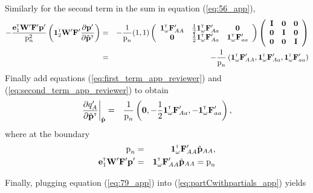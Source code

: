 \documentclass[11pt]{article}
\newcommand{\bo}[1]{{\bf #1}}
\newcommand{\tr}{{\mbox{\tiny \sf T}}}
\begin{document}
Similarly for the second term in the sum in equation (\ref{eq:56_app}),
\begin{eqnarray}
	- \frac{\mathbf{e}_1^\tr \mathbf{W}^\prime \mathbf{F}^\prime \mathbf{p}^\prime}{ \mbox{p}_{n}^2} \left( \mathbf{1}^\tr_{2}\mathbf{W}^\prime\mathbf{F}^\prime \frac{\partial  \mathbf{p}^\prime}{\partial \tilde{\bo p}^\tr} \right) &=& -\frac{1}{ \mbox{p}_{n}}(1,1) \left(\begin{array} {ccc}
\mathbf{1}^\tr_{\omega} \mathbf{F}_{AA}^\prime& \frac{1}{2}\mathbf{1}^\tr_{\omega} \mathbf{F}_{Aa}^\prime &\mathbf{0} \\
\mathbf{0} &\frac{1}{2}\mathbf{1}^\tr_{\omega} \mathbf{F}_{Aa}^\prime & \mathbf{1}^\tr_{\omega} \mathbf{F}_{aa}^\prime
\end{array}\right)  \left(\begin{array} {ccc}
\mathbf{I}&\mathbf{0}  &\mathbf{0} \\
\mathbf{0} &\mathbf{I}& \mathbf{0}  \\
\mathbf{0} &\mathbf{0}  &  \mathbf{I}
\end{array}\right) \nonumber \\
 &=& -\frac{1}{ \mbox{p}_{n}} \left( \mathbf{1}^\tr_{\omega} \mathbf{F}_{AA}^\prime, \mathbf{1}^\tr_{\omega} \mathbf{F}_{Aa}^\prime, \mathbf{1}^\tr_{\omega} \mathbf{F}_{aa}^\prime   \right) \label{eq:second_term_app_reviewer}
\end{eqnarray}
Finally add equations (\ref{eq:first_term_app_reviewer}) and (\ref{eq:second_term_app_reviewer}) to obtain
\begin{eqnarray}
  \frac{\partial   q^\prime_A }{\partial \tilde{\bo p}^\tr}\bigg\rvert_{\hat{\bo p}}&=& \frac{1}{ \mbox{p}_{n}} \left( \mathbf{0},  -\frac{1}{2}\mathbf{1}^\tr_{\omega} \mathbf{F}_{Aa}^\prime, -\mathbf{1}^\tr_{\omega} \mathbf{F}_{aa}^\prime \right) \label{eq:79_app},
\end{eqnarray}
where at the boundary
\begin{eqnarray}
  \mbox{p}_{n}&=&\mathbf{1}^\tr_\omega \mathbf{F}_{AA}^\prime \hat{\mathbf{p}}_{AA}, \\
  \mathbf{e}_1^\tr \mathbf{W}^\prime \mathbf{F}^\prime \mathbf{p}^\prime&=&\mathbf{1}^\tr_\omega \mathbf{F}_{AA}^\prime \hat{\mathbf{p}}_{AA}=  \mbox{p}_{n}
\end{eqnarray}


Finally, plugging equation (\ref{eq:79_app}) into (\ref{eq:partCwithpartials_app}) yields
\end{document}
